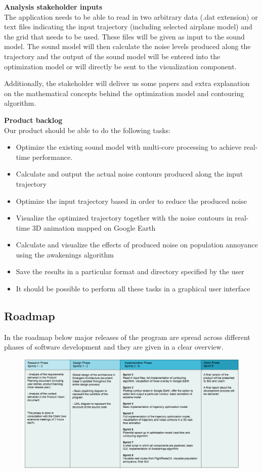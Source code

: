 \textbf{Analysis stakeholder inputs} \\
The application needs to be able to read in two arbitrary data (.dat extension) or text files indicating the input trajectory (including selected airplane model) and the grid that needs to be used. These files will be given as input to the sound model. The sound model will then calculate the noise levels produced along the trajectory and the output of the sound model will be entered into the optimization model or will directly be sent to the visualization component.

Additionally, the stakeholder will deliver us some papers and extra explanation on the mathematical concepts behind the optimization model and contouring algorithm.

\textbf{Product backlog} \\
Our product should be able to do the following tasks:

\begin{itemize}
\item Optimize the existing sound model with multi-core processing to achieve real-time performance.
\item Calculate and output the actual noise contours produced along the input trajectory
\item Optimize the input trajectory based in order to reduce the produced noise 
\item Visualize the optimized trajectory together with the noise contours in real-time 3D animation mapped on Google Earth
\item Calculate and visualize the effects of produced noise on population annoyance using the awakenings algorithm
\item Save the results in a particular format and directory specified by the user
\item It should be possible to perform all these tasks in a graphical user interface
\end{itemize}

\newpage 

\subsection{Roadmap}
In the roadmap below major releases of the program are spread across different phases of software development and they are given in a clear overview. \\

\begin{figure}[ht]
    \centering
    \includegraphics[width=1.1\textwidth]{images/roadmap}
\end{figure}
